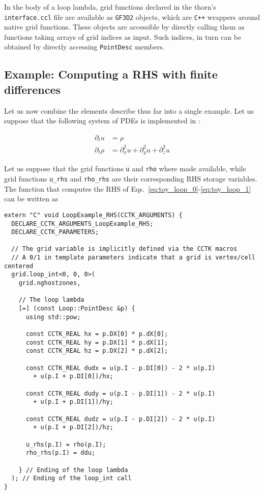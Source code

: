In the body of a loop lambda, grid functions declared in the thorn's \texttt{interface.ccl} file are available as \texttt{GF3D2} objects, which are \texttt{C++} wrappers around native \Cactus\space grid functions. These objects are accessible by directly calling them as functions taking arrays of grid indices as input. Such indices, in turn can be obtained by directly accessing \texttt{PointDesc} members.

\subsection{Example: Computing a RHS with finite differences}

Let us now combine the elements describe thus far into a single example. Let us suppose that the following system of PDEs is implemented in \Cactus:

\begin{align}
  \partial_t u & = \rho \label{eq:toy_loop_0}\\
  \partial_t \rho & = \partial_x^2 u + \partial_y^2 u + \partial_z^2 u \label{eq:toy_loop_1}
\end{align}

Let us suppose that the grid functions \texttt{u} and \texttt{rho} where made available, while grid functions \texttt{u\_rhs} and \texttt{rho\_rhs} are their corresponding RHS storage variables. The function that computes the RHS of Eqs.~\eqref{eq:toy_loop_0}-\eqref{eq:toy_loop_1} can be written as

\begin{lstlisting}
extern "C" void LoopExample_RHS(CCTK_ARGUMENTS) {
  DECLARE_CCTK_ARGUMENTS_LoopExample_RHS;
  DECLARE_CCTK_PARAMETERS;

  // The grid variable is implicitly defined via the CCTK macros
  // A 0/1 in template parameters indicate that a grid is vertex/cell centered
  grid.loop_int<0, 0, 0>(
    grid.nghostzones,

    // The loop lambda
    [=] (const Loop::PointDesc &p) {
      using std::pow;

      const CCTK_REAL hx = p.DX[0] * p.dX[0];
      const CCTK_REAL hy = p.DX[1] * p.dX[1];
      const CCTK_REAL hz = p.DX[2] * p.dX[2];
      
      const CCTK_REAL dudx = u(p.I - p.DI[0]) - 2 * u(p.I) 
        + u(p.I + p.DI[0])/hx;

      const CCTK_REAL dudy = u(p.I - p.DI[1]) - 2 * u(p.I) 
        + u(p.I + p.DI[1])/hy;

      const CCTK_REAL dudz = u(p.I - p.DI[2]) - 2 * u(p.I) 
        + u(p.I + p.DI[2])/hz;

      u_rhs(p.I) = rho(p.I);
      rho_rhs(p.I) = ddu;

    } // Ending of the loop lambda
  ); // Ending of the loop_int call
}
\end{lstlisting}
